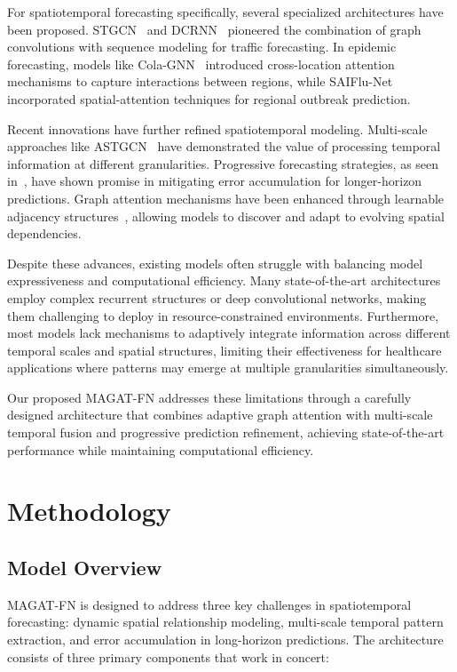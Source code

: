 \documentclass[lettersize, journal]{IEEEtran}
\begin{document}
For spatiotemporal forecasting specifically, several specialized architectures have been proposed. STGCN~\cite{stgcn} and DCRNN~\cite{dcrnn} pioneered the combination of graph convolutions with sequence modeling for traffic forecasting. In epidemic forecasting, models like Cola-GNN~\cite{cola_gnn} introduced cross-location attention mechanisms to capture interactions between regions, while SAIFlu-Net~\cite{saiflu_net} incorporated spatial-attention techniques for regional outbreak prediction.

Recent innovations have further refined spatiotemporal modeling. Multi-scale approaches like ASTGCN~\cite{astgcn} have demonstrated the value of processing temporal information at different granularities. Progressive forecasting strategies, as seen in~\cite{progressive_forecasting}, have shown promise in mitigating error accumulation for longer-horizon predictions. Graph attention mechanisms have been enhanced through learnable adjacency structures~\cite{adaptive_graph}, allowing models to discover and adapt to evolving spatial dependencies.

Despite these advances, existing models often struggle with balancing model expressiveness and computational efficiency. Many state-of-the-art architectures employ complex recurrent structures or deep convolutional networks, making them challenging to deploy in resource-constrained environments. Furthermore, most models lack mechanisms to adaptively integrate information across different temporal scales and spatial structures, limiting their effectiveness for healthcare applications where patterns may emerge at multiple granularities simultaneously.

Our proposed MAGAT-FN addresses these limitations through a carefully designed architecture that combines adaptive graph attention with multi-scale temporal fusion and progressive prediction refinement, achieving state-of-the-art performance while maintaining computational efficiency.

\section{Methodology}
\label{sec:methodology}

\subsection{Model Overview}
MAGAT-FN is designed to address three key challenges in spatiotemporal forecasting: dynamic spatial relationship modeling, multi-scale temporal pattern extraction, and error accumulation in long-horizon predictions. The architecture consists of three primary components that work in concert:
\end{document}
